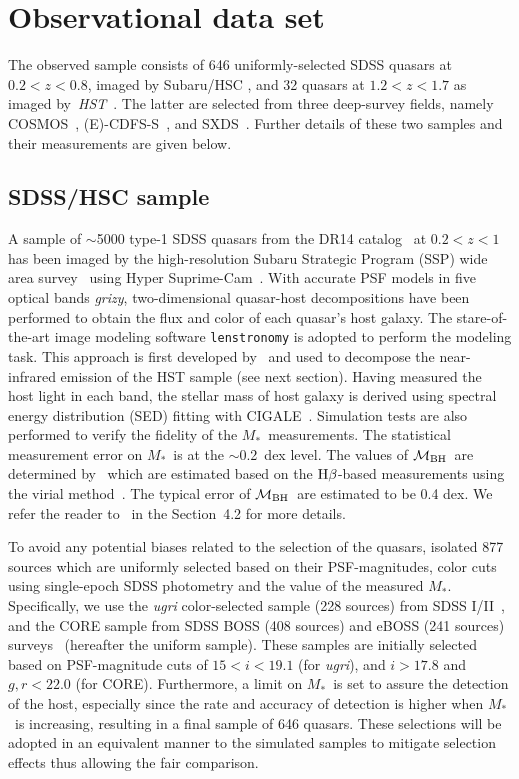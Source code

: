 \documentclass[twocolumn]{aastex631}
\def\smass{{$M_*$}}
\def\hbeta{${\rm H}\beta$}
\def\mbh{$\mathcal M_{\rm BH}$}
\def\hst{{\it HST}}
\begin{document}
\section{Observational data set}
\label{sec:observations}
The observed sample consists of 646 uniformly-selected SDSS quasars at $0.2<z<0.8$, imaged by Subaru/HSC \citep{Li2021a}, and 32 quasars at $1.2<z<1.7$ as imaged by~\hst~\citep[][hereafter D20]{Ding2020}. The latter are selected from three deep-survey fields, namely COSMOS~\citep{Civano2016}, (E)-CDFS-S~\citep{Lehmer2005, Xue2011}, and SXDS~\citep{Ueda2008}. Further details of these two samples and their measurements are given below. 

\subsection{SDSS/HSC sample}\label{sec:hsc}
A sample of $\sim$5000 type-1 SDSS quasars from the DR14 catalog~\citep{Paris2018} at $0.2<z<1$ has been imaged by the high-resolution Subaru Strategic Program (SSP) wide area survey~\citep{Aihara2019} using Hyper Suprime-Cam~\citep{Miyazaki2018}. With accurate PSF models in five optical bands {\it grizy}, two-dimensional quasar-host decompositions have been performed \citep[][hereafter L21a]{Li2021a} to obtain the flux and color of each quasar's host galaxy. The stare-of-the-art image modeling software {\tt lenstronomy} \citep{Birrer2015, Birrer2018, Birrer2021} is adopted to perform the modeling task. This approach is first developed by~\citet{Ding2020} and used to decompose the near-infrared emission of the HST sample (see next section). Having measured the host light in each band, the stellar mass of host galaxy is derived using spectral energy distribution (SED) fitting with CIGALE~\citep{Boquien2019}. Simulation tests are also performed to verify the fidelity of the \smass\ measurements. The statistical measurement error on \smass\ is at the $\sim$0.2~dex level. The values of \mbh\ are determined by~\citet{Rakshit2020} which are estimated based on the \hbeta-based measurements using the virial method~\citep{Peterson2004, Vestergaard2006}. The typical error of \mbh\ are estimated to be 0.4 dex. We refer the reader to~\citet{Li2021a} in the Section~4.2 for more details.

To avoid any potential biases related to the selection of the quasars, \citet{2021arXiv210902751L} isolated 877 sources which are uniformly selected based on their PSF-magnitudes, color cuts using single-epoch SDSS photometry and the value of the measured \smass. Specifically, we use the {\it ugri} color-selected sample (228 sources) from SDSS I/II~\citep{Richards2002}, and the CORE sample from SDSS BOSS (408 sources) and eBOSS (241 sources) surveys~\citep{Ross2013, Myers2015} (hereafter the uniform sample). These samples are initially selected based on PSF-magnitude cuts of $15 < i < 19.1$ (for {\it ugri}), and $i > 17.8$ and $g, r < 22.0$ (for CORE). Furthermore, a limit on \smass\ is set to assure the detection of the host, especially since the rate and accuracy of detection is higher when \smass\ is increasing, resulting in a final sample of 646 quasars. These selections will be adopted in an equivalent manner to the simulated samples to mitigate selection effects thus allowing the fair comparison.
\end{document}
